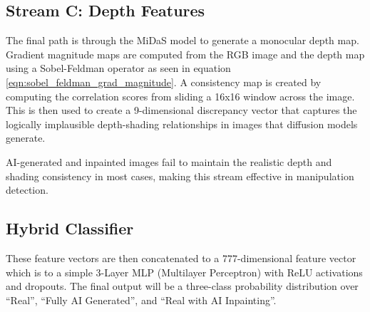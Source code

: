 \subsection{Stream C: Depth Features} \label{subsection:streamc}

The final path is through the MiDaS model to generate a monocular
depth map. Gradient magnitude maps are computed from the RGB image
and the depth map using a Sobel-Feldman operator as seen in equation
\ref{eqn:sobel_feldman_grad_magnitude}. A consistency map
is created by computing the correlation scores from sliding a 16x16
window across the image. This is then used to create a 9-dimensional
discrepancy vector that captures the logically implausible
depth-shading relationships in images that diffusion models generate.



AI-generated and inpainted images fail to maintain the realistic
depth and shading consistency in most cases, making this stream
effective in manipulation detection.

\subsection{Hybrid Classifier} \label{subsection:Hybrid}

These feature vectors are then concatenated to a 777-dimensional
feature vector which is  to a simple 3-Layer MLP (Multilayer
Perceptron) with ReLU activations and dropouts.
The final output will be a three-class probability distribution over
“Real”, “Fully AI Generated”, and “Real with AI Inpainting”.
